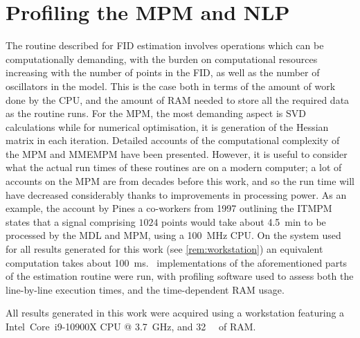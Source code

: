 \section{Profiling the \acs{MPM} and \acs{NLP}}
\label{sec:profiling}
The routine described for \ac{FID} estimation involves operations which can be
computationally demanding, with the burden on computational resources
increasing with the number of points in the \ac{FID}, as well as the number of
oscillators in the model. This is the case both in terms of the amount of work
done by the \ac{CPU}, and the amount of \ac{RAM} needed to store all the
required data as the routine runs. For the \ac{MPM}, the most
demanding aspect is \ac{SVD} calculations while for numerical optimisation, it
is generation of the Hessian matrix in each iteration. Detailed accounts of the
computational complexity of the \ac{MPM} and \ac{MMEMPM} have been
presented\cite{Hua1992,Chen2007}.  However, it is useful to consider what the
actual run times of these routines are on a modern computer; a lot of
accounts on the \ac{MPM} are from decades before this work, and so the
run time will have decreased considerably thanks to
improvements in processing power. As an example, the account by Pines a
co-workers from 1997 outlining the \ac{ITMPM} states that a signal comprising
$1024$ points would take about
\qty{4.5}{\minute} to be processed by the \ac{MDL} and \ac{MPM}, using a
\qty{100}{\mega\hertz} \ac{CPU}\cite{Lin1997}. On the system used for all
results generated for this work (see \cref{rem:workstation}) an
equivalent computation takes about \qty{100}{\milli\second}.
\Python\ implementations of the aforementioned parts of the estimation routine
were run, with profiling software used to assess both the line-by-line
execution times\cite{LineProf}, and the time-dependent \ac{RAM}
usage\cite{MemProf}.
\begin{remark}
    \label{rem:workstation}
    All results generated in this work were acquired using a workstation
    featuring a Intel\textregistered\ Core\texttrademark\ i9-10900X \ac{CPU} @
    \qty{3.7}{\giga\hertz}, and \qty{32}{\gibi\byte} of \ac{RAM}.
\end{remark}

